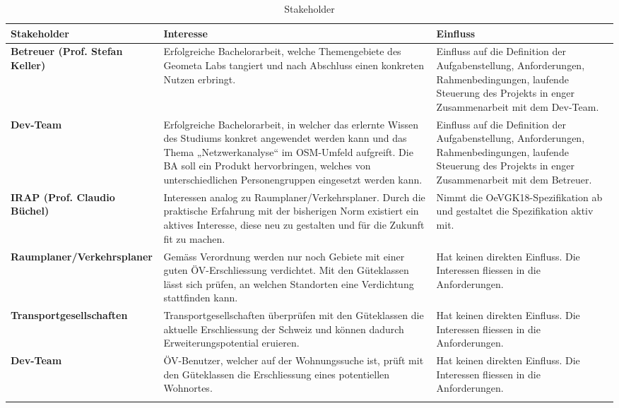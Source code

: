 \begin{landscape}
\begin{longtable}{l p{9cm} p{9cm}}
        \toprule
        \textbf{Stakeholder}
                                & \textbf{Interesse}
                                & \textbf{Einfluss} \\
        \midrule
        \textbf{Betreuer (Prof. Stefan Keller)}
                                & Erfolgreiche Bachelorarbeit, welche Themengebiete des Geometa Labs tangiert und nach Abschluss einen konkreten Nutzen erbringt.
                                & Einfluss auf die Definition der Aufgabenstellung, Anforderungen, Rahmenbedingungen, laufende Steuerung des Projekts in enger Zusammenarbeit mit dem Dev-Team. \\
        \textbf{Dev-Team}
                                & Erfolgreiche Bachelorarbeit, in welcher das erlernte Wissen des Studiums konkret angewendet werden kann und das Thema „Netzwerkanalyse“ im \acs{OSM}-Umfeld aufgreift. Die BA soll ein Produkt hervorbringen, welches von unterschiedlichen Personengruppen eingesetzt werden kann.
                                & Einfluss auf die Definition der Aufgabenstellung, Anforderungen,  Rahmenbedingungen, laufende Steuerung des Projekts in enger Zusammenarbeit mit dem Betreuer. \\                                
        \textbf{IRAP (Prof. Claudio Büchel)}
                                & Interessen analog zu Raumplaner/Verkehrsplaner. Durch die praktische Erfahrung mit der bisherigen Norm existiert ein aktives Interesse, diese neu zu gestalten und für die Zukunft fit zu machen.
                                & Nimmt die \gls{OeVGK18}-Spezifikation ab und gestaltet die Spezifikation aktiv mit. \\
        \textbf{Raumplaner/Verkehrsplaner}
                                & Gemäss Verordnung werden nur noch Gebiete mit einer guten ÖV-Erschliessung verdichtet. Mit den Güteklassen lässt sich prüfen, an welchen Standorten eine Verdichtung stattfinden kann.
                                & Hat keinen direkten Einfluss. Die Interessen fliessen in die Anforderungen. \\     
        \textbf{Transportgesellschaften}
                                & Transportgesellschaften überprüfen mit den Güteklassen die aktuelle Erschliessung der Schweiz und können dadurch Erweiterungspotential eruieren.
                                & Hat keinen direkten Einfluss. Die Interessen fliessen in die Anforderungen. \\       
        \textbf{Dev-Team}
                                & ÖV-Benutzer, welcher auf der Wohnungssuche ist, prüft mit den Güteklassen die Erschliessung eines potentiellen Wohnortes.
                                & Hat keinen direkten Einfluss. Die Interessen fliessen in die Anforderungen. \\                                                   
        \bottomrule
    \caption{Stakeholder}
    \label{table:Stakeholder}
\end{longtable}
\end{landscape}

